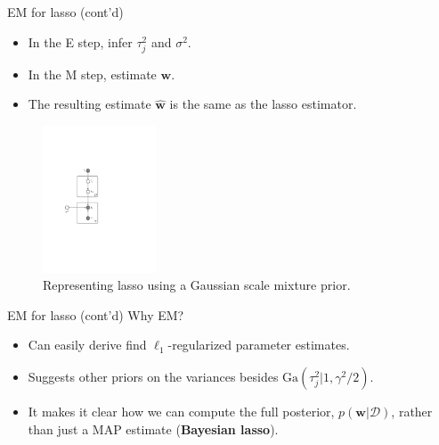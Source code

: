 \documentclass[10pt,mathserif]{beamer}
\begin{document}
\begin{frame}{EM for lasso (cont'd)}
\begin{itemize}
    \item In the E step, infer $\tau_j^2$ and $\sigma^2$.
    \item In the M step, estimate $\bm{w}$.
    \item The resulting estimate $\hat{\bm{w}}$ is the same as the lasso estimator.
\end{itemize}

\begin{figure}[h]
\centering
\includegraphics[width=0.3\textwidth]{lassoEMnoSigma}
\caption{Representing lasso using a Gaussian scale mixture prior.}
\end{figure}
\end{frame}

\begin{frame}{EM for lasso (cont'd)}
 Why EM?
\begin{itemize}
    \item Can easily derive find $\ell_1$-regularized parameter estimates.
    \item Suggests other priors on the variances besides $\text{Ga}(\tau_j^2|1,\gamma^2/2)$. 
    \item It makes it clear how we can compute the full posterior, $p(\bm{w}|\mathcal{D})$, rather than just a MAP estimate (\textbf{Bayesian lasso}).
\end{itemize}           
\end{frame}
\end{document}
